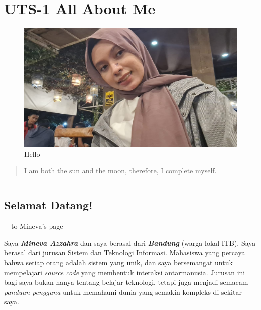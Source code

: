 \documentclass[
  letterpaper,
  DIV=11,
  numbers=noendperiod]{scrreprt}
\begin{document}

\chapter{UTS-1 All About Me}\label{uts-1-all-about-me}

\begin{figure}[H]

{\centering \includegraphics[width=1\linewidth,height=\textheight,keepaspectratio]{images/mi.jpeg}

}

\caption{Hello}

\end{figure}%

\begin{quote}
I am both the sun and the moon, therefore, I complete myself.
\end{quote}

\begin{center}\rule{0.5\linewidth}{0.5pt}\end{center}

\section{Selamat Datang!}\label{selamat-datang}

---to Mineva's page

Saya \textbf{\emph{Mineva Azzahra}} dan saya berasal dari
\textbf{\emph{Bandung}} (warga lokal ITB). Saya berasal dari jurusan
Sistem dan Teknologi Informasi. Mahasiswa yang percaya bahwa setiap
orang adalah sistem yang unik, dan saya bersemangat untuk mempelajari
\emph{source code} yang membentuk interaksi antarmanusia. Jurusan ini
bagi saya bukan hanya tentang belajar teknologi, tetapi juga menjadi
semacam \emph{panduan pengguna} untuk memahami dunia yang semakin
kompleks di sekitar saya.
\end{document}
